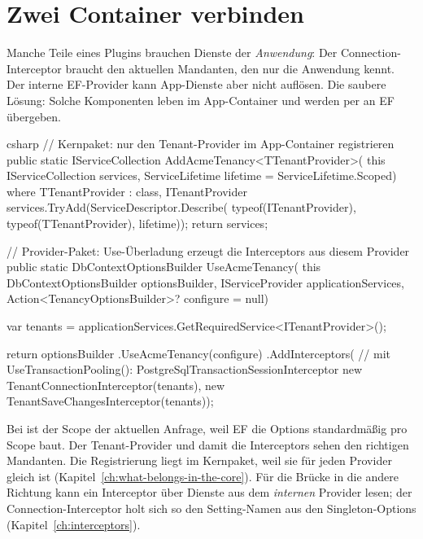 \section{Zwei Container verbinden}

Manche Teile eines Plugins brauchen Dienste der \emph{Anwendung}: Der Connection-Interceptor
braucht den aktuellen Mandanten, den nur die Anwendung kennt. Der interne EF-Provider kann
App-Dienste aber nicht auflösen. Die saubere Lösung: Solche Komponenten leben im
App-Container und werden per  an EF übergeben.

\begin{sourcecode}{csharp}
// Kernpaket: nur den Tenant-Provider im App-Container registrieren
public static IServiceCollection AddAcmeTenancy<TTenantProvider>(
    this IServiceCollection services,
    ServiceLifetime lifetime = ServiceLifetime.Scoped)
    where TTenantProvider : class, ITenantProvider
{
    services.TryAdd(ServiceDescriptor.Describe(
        typeof(ITenantProvider), typeof(TTenantProvider), lifetime));
    return services;
}

// Provider-Paket: Use-Überladung erzeugt die Interceptors aus diesem Provider
public static DbContextOptionsBuilder UseAcmeTenancy(
    this DbContextOptionsBuilder optionsBuilder,
    IServiceProvider applicationServices,
    Action<TenancyOptionsBuilder>? configure = null)
{
    var tenants = applicationServices.GetRequiredService<ITenantProvider>();

    return optionsBuilder
        .UseAcmeTenancy(configure)
        .AddInterceptors(
            // mit UseTransactionPooling(): PostgreSqlTransactionSessionInterceptor
            new TenantConnectionInterceptor(tenants),
            new TenantSaveChangesInterceptor(tenants));
}
\end{sourcecode}

Bei  ist  der Scope der aktuellen
Anfrage, weil EF die Options standardmäßig pro Scope baut. Der Tenant-Provider und damit
die Interceptors sehen den richtigen Mandanten. Die Registrierung liegt im Kernpaket, weil
sie für jeden Provider gleich ist (Kapitel~\ref{ch:what-belongs-in-the-core}). Für die
Brücke in die andere Richtung kann ein Interceptor über
Dienste aus dem \emph{internen} Provider lesen; der Connection-Interceptor holt sich so den
Setting-Namen aus den Singleton-Options (Kapitel~\ref{ch:interceptors}).

